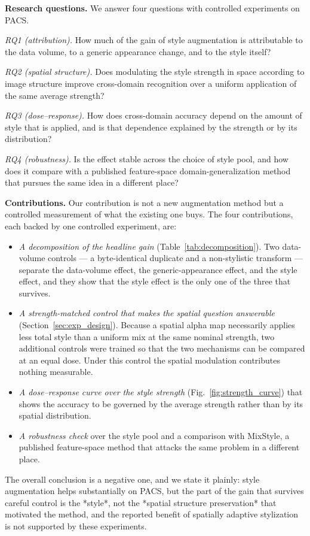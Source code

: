 \noindent\textbf{Research questions.} We answer four questions with controlled experiments on PACS.

\textit{RQ1 (attribution).} How much of the gain of style augmentation is attributable to the data volume, to a generic appearance change, and to the style itself?

\textit{RQ2 (spatial structure).} Does modulating the style strength in space according to image structure improve cross-domain recognition over a uniform application of the same average strength?

\textit{RQ3 (dose--response).} How does cross-domain accuracy depend on the amount of style that is applied, and is that dependence explained by the strength or by its distribution?

\textit{RQ4 (robustness).} Is the effect stable across the choice of style pool, and how does it compare with a published feature-space domain-generalization method that pursues the same idea in a different place?

\noindent\textbf{Contributions.} Our contribution is not a new augmentation method but a controlled measurement of what the existing one buys. The four contributions, each backed by one controlled experiment, are:

\begin{itemize}
\item \textit{A decomposition of the headline gain} (Table~\ref{tab:decomposition}). Two data-volume controls --- a byte-identical duplicate and a non-stylistic transform --- separate the data-volume effect, the generic-appearance effect, and the style effect, and they show that the style effect is the only one of the three that survives.
\item \textit{A strength-matched control that makes the spatial question answerable} (Section~\ref{sec:exp_design}). Because a spatial alpha map necessarily applies less total style than a uniform mix at the same nominal strength, two additional controls were trained so that the two mechanisms can be compared at an equal dose. Under this control the spatial modulation contributes nothing measurable.
\item \textit{A dose--response curve over the style strength} (Fig.~\ref{fig:strength_curve}) that shows the accuracy to be governed by the average strength rather than by its spatial distribution.
\item \textit{A robustness check} over the style pool and a comparison with MixStyle, a published feature-space method that attacks the same problem in a different place.
\end{itemize}

The overall conclusion is a negative one, and we state it plainly: style augmentation helps substantially on PACS, but the part of the gain that survives careful control is the *style*, not the *spatial structure preservation* that motivated the method, and the reported benefit of spatially adaptive stylization is not supported by these experiments.
